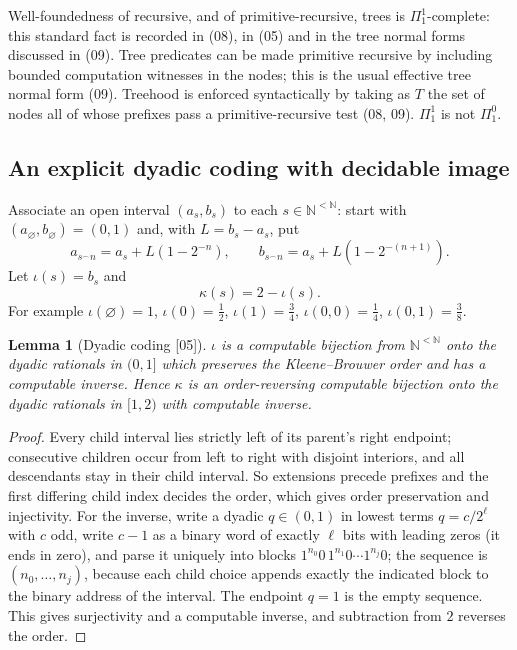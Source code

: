 \documentclass[11pt,oneside]{article}
\numberwithin{equation}{section}
\newtheorem{lemma}[lemma]{Lemma}
\theoremstyle{definition}
\theoremstyle{remark}
\newcommand{\N}{\mathbb N}
\newcommand{\src}[1]{\textup{\textsf{\small[#1]}}}
\begin{document}
Well-foundedness of recursive, and of primitive-recursive, trees is
$\Pi^1_1$-complete: this standard fact is recorded in
\cite[Theorem~2.6(g)]{CMR} (08), in \cite[Theorems~5.2.10 and 7.1.4]{Pohlers}
(05) and in the tree normal forms discussed in \cite[Section~2]{DowneyMontalban}
(09). Tree predicates can be made primitive recursive by including bounded
computation witnesses in the nodes; this is the usual effective tree normal form
(09). Treehood is enforced syntactically by taking as $T$ the set of nodes all of
whose prefixes pass a primitive-recursive test (08, 09). $\Pi^1_1$ is not
$\Pi^0_1$.

\subsection{An explicit dyadic coding with decidable image}

Associate an open interval $(a_s,b_s)$ to each $s\in\N^{<\N}$: start with
$(a_\varnothing,b_\varnothing)=(0,1)$ and, with $L=b_s-a_s$, put
\begin{equation}\label{onot:neg:eq:intervals}
 a_{s^\frown n}=a_s+L(1-2^{-n}),\qquad b_{s^\frown n}=a_s+L(1-2^{-(n+1)}).
\end{equation}
Let $\iota(s)=b_s$ and
\begin{equation}\label{onot:neg:eq:dyadic}
 \kappa(s)=2-\iota(s).
\end{equation}
For example $\iota(\varnothing)=1$, $\iota(0)=\tfrac12$, $\iota(1)=\tfrac34$,
$\iota(0,0)=\tfrac14$, $\iota(0,1)=\tfrac38$.

\begin{lemma}[Dyadic coding \src{05}]\label{onot:neg:lem:dyadic}
$\iota$ is a computable bijection from $\N^{<\N}$ onto the dyadic rationals in
$(0,1]$ which preserves the Kleene--Brouwer order and has a computable inverse.
Hence $\kappa$ is an order-reversing computable bijection onto the dyadic rationals
in $[1,2)$ with computable inverse.
\end{lemma}
\begin{proof}
Every child interval lies strictly left of its parent's right endpoint;
consecutive children occur from left to right with disjoint interiors, and all
descendants stay in their child interval. So extensions precede prefixes and the
first differing child index decides the order, which gives order preservation and
injectivity. For the inverse, write a dyadic $q\in(0,1)$ in lowest terms
$q=c/2^\ell$ with $c$ odd, write $c-1$ as a binary word of exactly $\ell$ bits
with leading zeros (it ends in zero), and parse it uniquely into blocks
$1^{n_0}0\,1^{n_1}0\cdots1^{n_j}0$; the sequence is $(n_0,\ldots,n_j)$, because each
child choice appends exactly the indicated block to the binary address of the
interval. The endpoint $q=1$ is the empty sequence. This gives surjectivity and a
computable inverse, and subtraction from $2$ reverses the order.
\end{proof}
\end{document}
